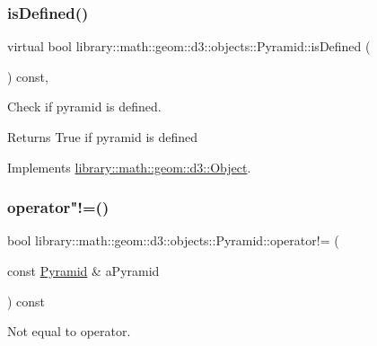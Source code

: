\subsubsection{\texorpdfstring{is\+Defined()}{isDefined()}}
{\footnotesize\ttfamily virtual bool library\+::math\+::geom\+::d3\+::objects\+::\+Pyramid\+::is\+Defined (\begin{DoxyParamCaption}{ }\end{DoxyParamCaption}) const\hspace{0.3cm}{\ttfamily [override]}, {\ttfamily [virtual]}}



Check if pyramid is defined. 


\begin{DoxyCode}
\end{DoxyCode}


\begin{DoxyReturn}{Returns}
True if pyramid is defined 
\end{DoxyReturn}


Implements \hyperlink{classlibrary_1_1math_1_1geom_1_1d3_1_1_object_a2216442e322f0c3ca5f01a4efa22baf7}{library\+::math\+::geom\+::d3\+::\+Object}.

\mbox{\label{classlibrary_1_1math_1_1geom_1_1d3_1_1objects_1_1_pyramid_a2067ce77436b89472125b37446bb6e3d}} 
\subsubsection{\texorpdfstring{operator"!=()}{operator!=()}}
{\footnotesize\ttfamily bool library\+::math\+::geom\+::d3\+::objects\+::\+Pyramid\+::operator!= (\begin{DoxyParamCaption}\item[{const \hyperlink{classlibrary_1_1math_1_1geom_1_1d3_1_1objects_1_1_pyramid}{Pyramid} \&}]{a\+Pyramid }\end{DoxyParamCaption}) const}



Not equal to operator. 


\begin{DoxyCode}
\end{DoxyCode}



